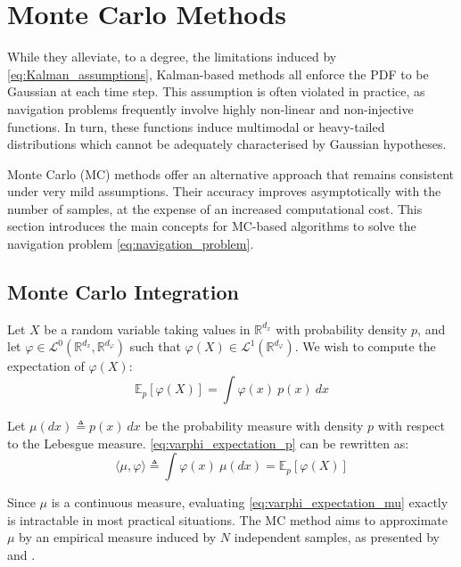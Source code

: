 \section{Monte Carlo Methods}\label{sec:Monte_Carlo}

While they alleviate, to a degree, the limitations induced by \eqref{eq:Kalman_assumptions}, Kalman-based methods all enforce the PDF to be Gaussian at each time step. This assumption is often violated in practice, as navigation problems frequently involve highly non-linear and non-injective functions. In turn, these functions induce multimodal or heavy-tailed distributions which cannot be adequately characterised by Gaussian hypotheses.

Monte Carlo (MC) methods offer an alternative approach that remains consistent under very mild assumptions. Their accuracy improves asymptotically with the number of samples, at the expense of an increased computational cost. This section introduces the main concepts for MC-based algorithms to solve the navigation problem \eqref{eq:navigation_problem}.

\subsection{Monte Carlo Integration}

Let $X$ be a random variable taking values in $\mathbb{R}^{d_x}$ with probability density $p$, and let $\varphi\in\mathcal{L}^0(\mathbb{R}^{d_x},\mathbb{R}^{d_{\varphi}})$ such that $\varphi(X)\in\mathcal{L}^1(\mathbb{R}^{d_{\varphi}})$. We wish to compute the expectation of $\varphi(X)$:
\begin{equation}
	\mathbb{E}_p[\varphi(X)]=\int{\varphi(x)\:p(x)\:dx}\label{eq:varphi_expectation_p}
\end{equation}

Let $\mu(dx)\triangleq p(x)\:dx$ be the probability measure with density $p$ with respect to the Lebesgue measure. \eqref{eq:varphi_expectation_p} can be rewritten as:
\begin{equation}
	\langle\mu,\varphi\rangle\triangleq\int{\varphi(x)\:\mu(dx)}=\mathbb{E}_p[\varphi(X)]\label{eq:varphi_expectation_mu}
\end{equation}

Since $\mu$ is a continuous measure, evaluating \eqref{eq:varphi_expectation_mu} exactly is intractable in most practical situations. The MC method aims to approximate $\mu$ by an empirical measure induced by $N$ independent samples, as presented by  and .


